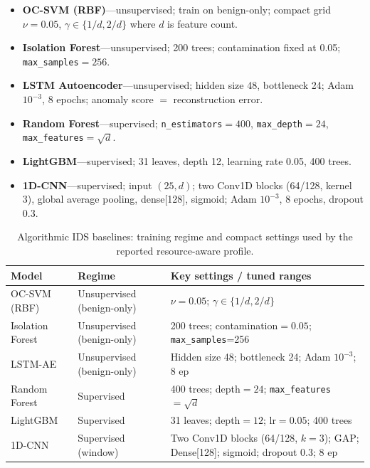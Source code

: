 \documentclass[preprint,12pt]{elsarticle}
\begin{document}
\begin{itemize}[leftmargin=*]
  \item \textbf{OC-SVM (RBF)}---unsupervised; train on benign-only; compact grid $\nu=0.05$, $\gamma\in\{1/d,2/d\}$ where $d$ is feature count.
  \item \textbf{Isolation Forest}---unsupervised; 200 trees; contamination fixed at 0.05; \texttt{max\_samples}$=256$.
  \item \textbf{LSTM Autoencoder}---unsupervised; hidden size 48, bottleneck 24; Adam $10^{-3}$, 8 epochs; anomaly score $=$ reconstruction error.
  \item \textbf{Random Forest}---supervised; \texttt{n\_estimators}$=400$, \texttt{max\_depth}$=24$, \texttt{max\_features}$=\sqrt{d}$.
  \item \textbf{LightGBM}---supervised; 31 leaves, depth 12, learning rate 0.05, 400 trees.
  \item \textbf{1D-CNN}---supervised; input $(25, d)$; two Conv1D blocks (64/128, kernel 3), global average pooling, dense[128], sigmoid; Adam $10^{-3}$, 8 epochs, dropout $0.3$.
\end{itemize}

\begin{table}[H]
\caption{Algorithmic IDS baselines: training regime and compact settings used by the reported resource-aware profile.}
\label{tab:ids_hparams}
\centering
\begin{tabularx}{\textwidth}{l l Y}
\toprule
Model & Regime & Key settings / tuned ranges \\
\midrule
OC-SVM (RBF) & Unsupervised (benign-only) & $\nu=0.05$; $\gamma\in\{1/d,2/d\}$ \\
Isolation Forest & Unsupervised (benign-only) & 200 trees; contamination$=0.05$; \texttt{max\_samples}=256 \\
LSTM-AE & Unsupervised (benign-only) & Hidden size 48; bottleneck 24; Adam $10^{-3}$; 8 ep \\
Random Forest & Supervised & 400 trees; depth$=24$; \texttt{max\_features}$=\sqrt{d}$ \\
LightGBM & Supervised & 31 leaves; depth$=12$; lr$=0.05$; 400 trees \\
1D-CNN & Supervised (window) & Two Conv1D blocks (64/128, $k{=}3$); GAP; Dense[128]; sigmoid; dropout 0.3; 8 ep \\
\bottomrule
\end{tabularx}
\end{table}
\end{document}
